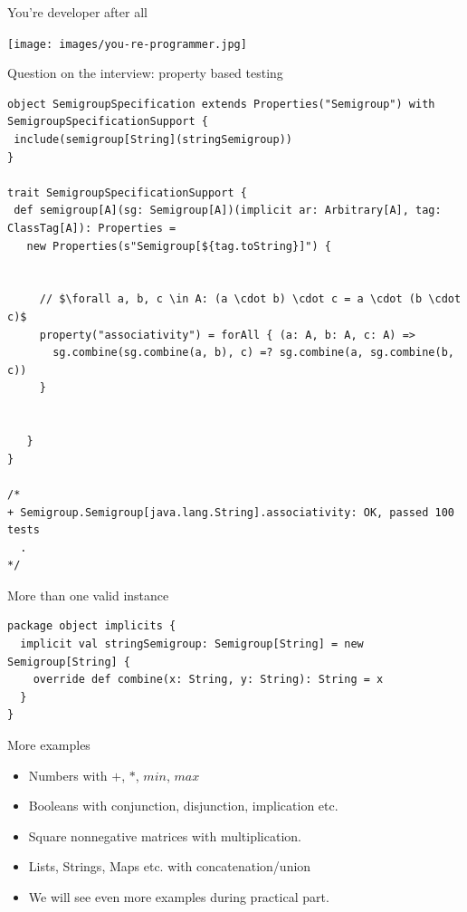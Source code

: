 \documentclass[presentation,aspectratio=169,smaller]{beamer}
\begin{document}
\begin{frame}[label={sec:org67dce9c}]{You're developer after all}
\begin{center}
\texttt{[image: images/you-re-programmer.jpg]}
\end{center}
\end{frame}

\begin{frame}[label={sec:org5225e97},fragile]{Question on the interview: property based testing}
 \begin{verbatim}
object SemigroupSpecification extends Properties("Semigroup") with SemigroupSpecificationSupport {
 include(semigroup[String](stringSemigroup))
}

trait SemigroupSpecificationSupport {
 def semigroup[A](sg: Semigroup[A])(implicit ar: Arbitrary[A], tag: ClassTag[A]): Properties =
   new Properties(s"Semigroup[${tag.toString}]") {


     // $\forall a, b, c \in A: (a \cdot b) \cdot c = a \cdot (b \cdot c)$
     property("associativity") = forAll { (a: A, b: A, c: A) =>
       sg.combine(sg.combine(a, b), c) =? sg.combine(a, sg.combine(b, c))
     }


   }
}

/*
+ Semigroup.Semigroup[java.lang.String].associativity: OK, passed 100 tests
  .
*/
\end{verbatim}
\end{frame}

\begin{frame}[label={sec:org13bfeac},fragile]{More than one valid instance}
 \begin{verbatim}
package object implicits {
  implicit val stringSemigroup: Semigroup[String] = new Semigroup[String] {
    override def combine(x: String, y: String): String = x
  }
}
\end{verbatim}
\end{frame}

\begin{frame}[label={sec:org12f632f}]{More examples}
\begin{itemize}
\item Numbers with \(+\), \(*\), \(min\), \(max\)
\item Booleans with conjunction, disjunction, implication etc.
\item Square nonnegative matrices with multiplication.
\item Lists, Strings, Maps etc. with concatenation/union
\item We will see even more examples during practical part.
\end{itemize}
\end{frame}
\end{document}
